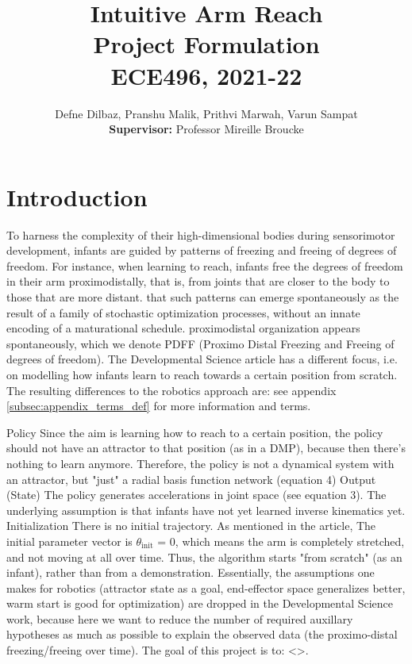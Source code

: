 \documentclass[10pt]{article}
\date{}
\begin{document}
\title{\vspace{-1cm}\textbf{\Large{Intuitive Arm Reach}} \\ \Large{Project Formulation} \\ \textbf{\small{ECE496, 2021-22}}\\\vspace{-0.3cm}}
\author{Defne Dilbaz, Pranshu Malik, Prithvi Marwah, Varun Sampat \\\small{\textbf{Supervisor:}} Professor Mireille Broucke \vspace{-3cm}}

\maketitle

\section{Introduction}
To harness the complexity of their high-dimensional bodies during sensorimotor development, infants are guided by patterns of freezing and freeing of degrees of freedom. For instance, when learning to reach, infants free the degrees of freedom in their arm proximodistally, that is, from joints that are closer to the body to those that are more distant. that such patterns can emerge spontaneously as the result of a family of stochastic optimization processes, without an innate encoding of a maturational schedule. proximodistal organization appears spontaneously, which we denote PDFF (Proximo Distal Freezing and Freeing of degrees of freedom).
The Developmental Science article has a different focus, i.e. on modelling how infants learn to reach towards a certain position from scratch. The resulting differences to the robotics approach are: see appendix \ref{subsec:appendix_terms_def} for more information and terms.

Policy Since the aim is learning how to reach to a certain position, the policy should not have an attractor to that position (as in a DMP), because then there's nothing to learn anymore. Therefore, the policy is not a dynamical system with an attractor, but "just" a radial basis function network (equation 4)
Output (State) The policy generates accelerations in joint space (see equation 3). The underlying assumption is that infants have not yet learned inverse kinematics yet.
Initialization There is no initial trajectory. As mentioned in the article, The initial parameter vector is $\theta_\text{init}$ = 0, which means the arm is completely stretched, and not moving at all over time. Thus, the algorithm starts "from scratch" (as an infant), rather than from a demonstration.
Essentially, the assumptions one makes for robotics (attractor state as a goal, end-effector space generalizes better, warm start is good for optimization) are dropped in the Developmental Science work, because here we want to reduce the number of required auxillary hypotheses as much as possible to explain the observed data (the proximo-distal freezing/freeing over time). The goal of this project is to: <>.
\end{document}
